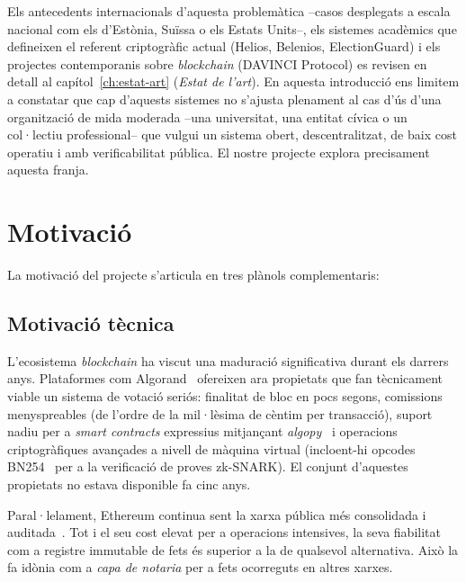 Els antecedents internacionals d'aquesta problemàtica --casos desplegats a escala nacional com els d'Estònia, Suïssa o
els Estats Units--, els sistemes acadèmics que defineixen el referent criptogràfic actual (Helios, Belenios,
ElectionGuard) i els projectes contemporanis sobre \emph{blockchain} (DAVINCI Protocol) es revisen en detall al
capítol~\ref{ch:estat-art} (\emph{Estat de l'art}).
En aquesta introducció ens limitem a constatar que cap d'aquests sistemes no s'ajusta plenament al cas d'ús d'una
organització de mida moderada --una universitat, una entitat cívica o un col·lectiu professional-- que vulgui un sistema
obert, descentralitzat, de baix cost operatiu i amb verificabilitat pública.
El nostre projecte explora precisament aquesta franja.



\section{Motivació}
\label{sec:motivacio}

La motivació del projecte s'articula en tres plànols complementaris:

\subsection{Motivació tècnica}
\label{subsec:motivacio-tecnica}

L'ecosistema \emph{blockchain} ha viscut una maduració significativa durant els darrers anys.
Plataformes com Algorand~\cite{chen2017algorand} ofereixen ara propietats que fan tècnicament viable un sistema de
votació seriós: finalitat de bloc en pocs segons, comissions menyspreables (de l'ordre de la mil·lèsima de cèntim per
transacció), suport nadiu per a \emph{smart contracts} expressius mitjançant
\emph{algopy}~\cite{algorandfoundation2024puya} i operacions criptogràfiques avançades a nivell de màquina virtual
(incloent-hi opcodes BN254~\cite{barreto2005pairing} per a la verificació de proves zk-SNARK).
El conjunt d'aquestes propietats no estava disponible fa cinc anys.

Paral·lelament, Ethereum continua sent la xarxa pública més consolidada i auditada~\cite{buterin2014ethereum}.
Tot i el seu cost elevat per a operacions intensives, la seva fiabilitat com a registre immutable de fets és superior a
la de qualsevol alternativa.
Això la fa idònia com a \emph{capa de notaria} per a fets ocorreguts en altres xarxes.

